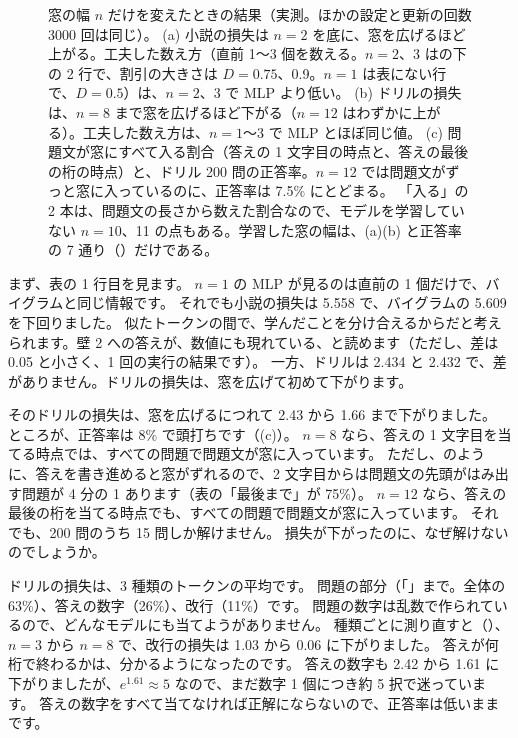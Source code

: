 \begin{figure}[tbp]
\caption{窓の幅 $n$ だけを変えたときの結果（実測。ほかの設定と更新の回数 3000 回は同じ）。
(a) 小説の損失は $n=2$ を底に、窓を広げるほど上がる。工夫した数え方（直前 1〜3 個を数える。$n=2$、3 はの下の 2 行で、割引の大きさは $D=0.75$、0.9。$n=1$ は表にない行で、$D=0.5$）は、$n=2$、3 で MLP より低い。
(b) ドリルの損失は、$n=8$ まで窓を広げるほど下がる（$n=12$ はわずかに上がる）。工夫した数え方は、$n=1$〜3 で MLP とほぼ同じ値。
(c) 問題文が窓にすべて入る割合（答えの 1 文字目の時点と、答えの最後の桁の時点）と、ドリル 200 問の正答率。$n=12$ では問題文がずっと窓に入っているのに、正答率は 7.5\% にとどまる。
「入る」の 2 本は、問題文の長さから数えた割合なので、モデルを学習していない $n=10$、11 の点もある。学習した窓の幅は、(a)(b) と正答率の 7 通り（）だけである。}
\label{fig:emb-window}
\end{figure}

まず、表の 1 行目を見ます。
$n=1$ の MLP が見るのは直前の 1 個だけで、バイグラムと同じ情報です。
それでも小説の損失は 5.558 で、バイグラムの 5.609 を下回りました。
似たトークンの間で、学んだことを分け合えるからだと考えられます。壁 2 への答えが、数値にも現れている、と読めます（ただし、差は 0.05 と小さく、1 回の実行の結果です）。
一方、ドリルは 2.434 と 2.432 で、差がありません。ドリルの損失は、窓を広げて初めて下がります。

そのドリルの損失は、窓を広げるにつれて 2.43 から 1.66 まで下がりました。
ところが、正答率は 8\% で頭打ちです（(c)）。
$n=8$ なら、答えの 1 文字目を当てる時点では、すべての問題で問題文が窓に入っています。
ただし、のように、答えを書き進めると窓がずれるので、2 文字目からは問題文の先頭がはみ出す問題が 4 分の 1 あります（表の「最後まで」が 75\%）。
$n=12$ なら、答えの最後の桁を当てる時点でも、すべての問題で問題文が窓に入っています。
それでも、200 問のうち 15 問しか解けません。
損失が下がったのに、なぜ解けないのでしょうか。

ドリルの損失は、3 種類のトークンの平均です。
問題の部分（「\code{=}」まで。全体の 63\%）、答えの数字（26\%）、改行（11\%）です。
問題の数字は乱数で作られているので、どんなモデルにも当てようがありません。
種類ごとに測り直すと（）、$n=3$ から $n=8$ で、改行の損失は 1.03 から 0.06 に下がりました。
答えが何桁で終わるかは、分かるようになったのです。
答えの数字も 2.42 から 1.61 に下がりましたが、$e^{1.61}\approx 5$ なので、まだ数字 1 個につき約 5 択で迷っています。
答えの数字をすべて当てなければ正解にならないので、正答率は低いままです。

